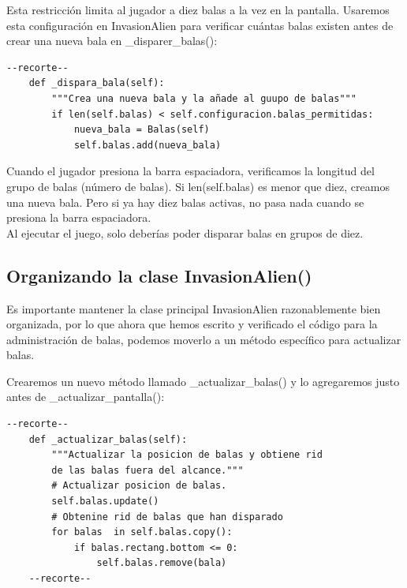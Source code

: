 Esta restricción limita al jugador a diez balas a la vez en la pantalla. Usaremos esta configuración en {\ttfamily InvasionAlien} para verificar cuántas balas existen antes de crear una nueva bala en  {\ttfamily \_disparer\_balas()}:



\hspace{-2.4cm}{\ttfamily \scriptsize invasión}

\vspace{-0.2cm}
\hspace{-2.1cm}{\ttfamily \scriptsize \_alien.py}\vspace{-0.84cm}
\begin{lstlisting}
--recorte--	
    def _dispara_bala(self):
        """Crea una nueva bala y la añade al guupo de balas"""
        if len(self.balas) < self.configuracion.balas_permitidas:
            nueva_bala = Balas(self)
            self.balas.add(nueva_bala)
\end{lstlisting}

Cuando el jugador presiona la barra espaciadora, verificamos la longitud del grupo de balas (número de balas). Si  {\ttfamily len(self.balas)} es menor que diez, creamos una nueva bala. Pero si ya hay diez balas activas, no pasa nada cuando se presiona la barra espaciadora. \\

Al ejecutar el juego, solo deberías poder disparar balas en grupos de diez.


\subsection{Organizando la clase InvasionAlien()}    %

Es importante mantener la clase principal {\ttfamily InvasionAlien} razonablemente bien organizada, por lo que ahora que hemos escrito y verificado el código para la administración de balas, podemos moverlo a un método específico para actualizar balas. 

Crearemos un nuevo método llamado  {\ttfamily \_actualizar\_balas()} y lo agregaremos justo antes de  {\ttfamily \_actualizar\_pantalla()}:


\hspace{-2.4cm}{\ttfamily \scriptsize invasión}

\vspace{-0.2cm}
\hspace{-2.1cm}{\ttfamily \scriptsize \_alien.py}\vspace{-0.84cm}
\begin{lstlisting}
--recorte--	
    def _actualizar_balas(self):
        """Actualizar la posicion de balas y obtiene rid 
        de las balas fuera del alcance."""
        # Actualizar posicion de balas.
        self.balas.update()
        # Obtenine rid de balas que han disparado
        for balas  in self.balas.copy():
            if balas.rectang.bottom <= 0:
                self.balas.remove(bala)
    --recorte--	
\end{lstlisting}


